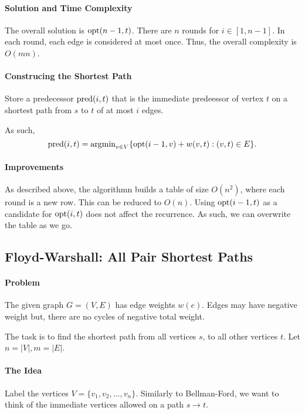 \paragraph{Solution and Time Complexity}
The overall solution is \(\mathrm{opt}(n - 1, t)\).
There are \(n\) rounds for \(i \in [1, n - 1]\). In each round,
each edge is considered at most once. Thus, the overall complexity is  \(O(mn)\).

\paragraph{Construcing the Shortest Path}
Store a predecessor \(\mathrm{pred}(i, t)\) that is the immediate predeessor of vertex \(t\)
on a shortest path from \(s\) to \(t\) of at most \(i\) edges.

As such, \[
  \mathrm{pred}(i, t) = \mathrm{argmin}_{v \in V} \{
    \mathrm{opt}(i - 1, v) + w(v, t) : (v, t) \in E
  \} 
.\] 

\paragraph{Improvements}
As described above, the algorithmn builds a table of size \(O(n^2)\),
where each round is a new row.
This can be reduced to \(O(n)\). Using  \(\mathrm{opt}(i - 1, t)\) as a candidate for
\(\mathrm{opt}(i, t)\) does not affect the recurrence. As such, we can overwrite
the table as we go.

\subsection{Floyd-Warshall: All Pair Shortest Paths}

\paragraph{Problem}
The given graph \(G = (V, E)\) has edge weights  \(w(e)\). Edges may have negative
weight but, there are no cycles of negative total weight.

The task is to find the shortest path from all vertices \(s\), to all other vertices
\(t\).
Let \(n = |V|, m = |E|\).


\paragraph{The Idea}
Label the vertices \(V = \{v_1, v_2, \ldots, v_n\} \).
Similarly to Bellman-Ford, we want to think of the immediate vertices allowed
on a path \(s \to t\).

